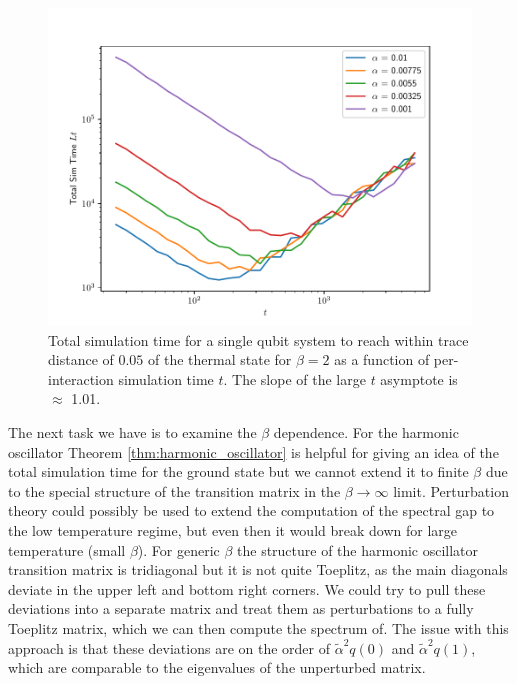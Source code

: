 \begin{figure} 
    \centering
    \includegraphics[width=0.75\linewidth]{tsp_numerics/data/single_qubit_tot_time_vs_t.pdf}
    \caption{Total simulation time for a single qubit system to reach within trace distance of $0.05$ of the thermal state for $\beta = 2$ as a function of per-interaction simulation time $t$. The slope of the large $t$ asymptote is $\approx$ 1.01.}\label{fig:tot_time_vs_single_time}
\end{figure}

The next task we have is to examine the $\beta$ dependence. For the harmonic oscillator Theorem \ref{thm:harmonic_oscillator} is helpful for giving an idea of the total simulation time for the ground state but we cannot extend it to finite $\beta$ due to the special structure of the transition matrix in the $\beta \to \infty$ limit. Perturbation theory could possibly be used to extend the computation of the spectral gap to the low temperature regime, but even then it would break down for large temperature (small $\beta$). For generic $\beta$ the structure of the harmonic oscillator transition matrix is tridiagonal but it is not quite Toeplitz, as the main diagonals deviate in the upper left and bottom right corners. We could try to pull these deviations into a separate matrix and treat them as perturbations to a fully Toeplitz matrix, which we can then compute the spectrum of. The issue with this approach is that these deviations are on the order of $\widetilde{\alpha}^2 q(0)$ and $\widetilde{\alpha}^2 q(1)$, which are comparable to the eigenvalues of the unperturbed matrix.

